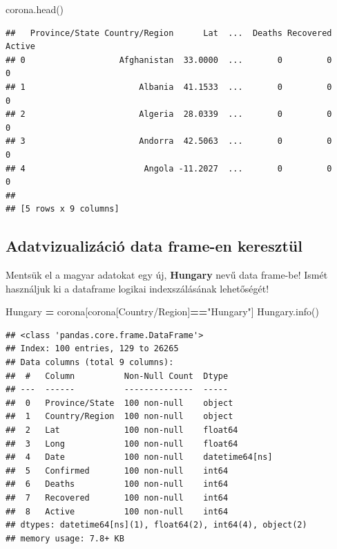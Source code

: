 \documentclass[
]{book}
\newenvironment{Shaded}{\begin{snugshade}}{\end{snugshade}}
\newcommand{\NormalTok}[1]{#1}
\newcommand{\OperatorTok}[1]{\textcolor[rgb]{0.81,0.36,0.00}{\textbf{#1}}}
\newcommand{\StringTok}[1]{\textcolor[rgb]{0.31,0.60,0.02}{#1}}
\begin{document}
\begin{Shaded}
\begin{Highlighting}[]
\NormalTok{corona.head()}
\end{Highlighting}
\end{Shaded}

\begin{verbatim}
##   Province/State Country/Region      Lat  ...  Deaths Recovered  Active
## 0                   Afghanistan  33.0000  ...       0         0       0
## 1                       Albania  41.1533  ...       0         0       0
## 2                       Algeria  28.0339  ...       0         0       0
## 3                       Andorra  42.5063  ...       0         0       0
## 4                        Angola -11.2027  ...       0         0       0
## 
## [5 rows x 9 columns]
\end{verbatim}

\subsection{Adatvizualizáció data frame-en keresztül}\label{adatvizualizuxe1ciuxf3-data-frame-en-keresztuxfcl}

Mentsük el a magyar adatokat egy új, \textbf{Hungary} nevű data frame-be!
Ismét használjuk ki a dataframe logikai indexszálásának lehetőségét!

\begin{Shaded}
\begin{Highlighting}[]
\NormalTok{Hungary }\OperatorTok{=}\NormalTok{ corona[corona[}\StringTok{\textquotesingle{}Country/Region\textquotesingle{}}\NormalTok{]}\OperatorTok{==}\StringTok{"Hungary"}\NormalTok{]}
\NormalTok{Hungary.info()}
\end{Highlighting}
\end{Shaded}

\begin{verbatim}
## <class 'pandas.core.frame.DataFrame'>
## Index: 100 entries, 129 to 26265
## Data columns (total 9 columns):
##  #   Column          Non-Null Count  Dtype         
## ---  ------          --------------  -----         
##  0   Province/State  100 non-null    object        
##  1   Country/Region  100 non-null    object        
##  2   Lat             100 non-null    float64       
##  3   Long            100 non-null    float64       
##  4   Date            100 non-null    datetime64[ns]
##  5   Confirmed       100 non-null    int64         
##  6   Deaths          100 non-null    int64         
##  7   Recovered       100 non-null    int64         
##  8   Active          100 non-null    int64         
## dtypes: datetime64[ns](1), float64(2), int64(4), object(2)
## memory usage: 7.8+ KB
\end{verbatim}
\end{document}
